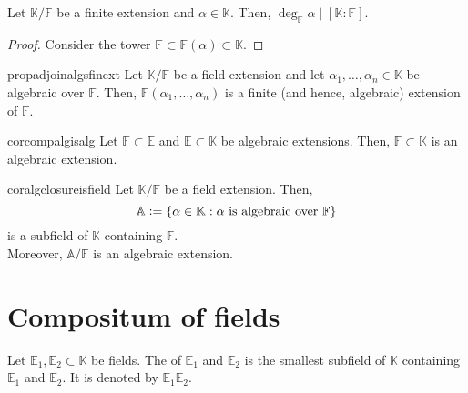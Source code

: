 \begin{cor}
    Let $\mathbb{K}/\mathbb{F}$ be a finite extension and $\alpha \in \mathbb{K}.$ Then, $\deg_{\mathbb{F}} \alpha \mid [\mathbb{K} : \mathbb{F}].$
\end{cor}
\begin{proof}
    Consider the tower $\mathbb{F} \subset \mathbb{F}(\alpha) \subset \mathbb{K}.$
\end{proof}

\begin{restatable}[]{prop}{adjoinalgsfinext}
\label{prop:adjoinalgsfinext}
    Let $\mathbb{K}/\mathbb{F}$ be a field extension and let $\alpha_1, \ldots, \alpha_n \in \mathbb{K}$ be algebraic over $\mathbb{F}.$ Then, $\mathbb{F}(\alpha_1, \ldots, \alpha_n)$ is a finite (and hence, algebraic) extension of $\mathbb{F}.$ \hfill\hyperref[prop:adjoinalgsfinext2]{\downsym}
\end{restatable}

\begin{restatable}[]{cor}{compalgisalg}
\label{cor:compalgisalg}
   Let $\mathbb{F} \subset \mathbb{E}$ and $\mathbb{E} \subset \mathbb{K}$ be algebraic extensions. Then, $\mathbb{F} \subset \mathbb{K}$ is an algebraic extension.  \hfill\hyperref[cor:compalgisalg2]{\downsym}
\end{restatable}

\begin{restatable}[]{cor}{algclosureisfield}
\label{cor:algclosureisfield}
    Let $\mathbb{K}/\mathbb{F}$ be a field extension. Then,
    \begin{equation*} 
        \mathbb{A} \vcentcolon= \{\alpha \in \mathbb{K} : \alpha \text{ is algebraic over }\mathbb{F}\}
    \end{equation*} is a subfield of $\mathbb{K}$ containing $\mathbb{F}.$ \\
    Moreover, $\mathbb{A}/\mathbb{F}$ is an algebraic extension. \hfill\hyperref[cor:algclosureisfield2]{\downsym}
\end{restatable}

\section{Compositum of fields}

\begin{defn}%
    Let $\mathbb{E}_1, \mathbb{E}_2 \subset \mathbb{K}$ be fields. The  of $\mathbb{E}_1$ and $\mathbb{E}_2$ is the smallest subfield of $\mathbb{K}$ containing $\mathbb{E}_1$ and $\mathbb{E}_2.$ It is denoted by $\mathbb{E}_1\mathbb{E}_2.$
\end{defn}

